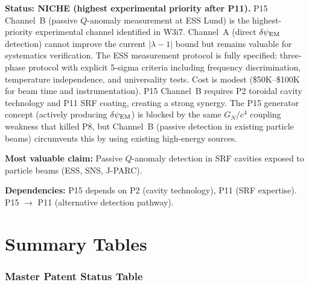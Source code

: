 \documentclass[11pt]{article}
\newcommand{\dpsiEM}{\delta\psi_{\rm EM}}
\newcommand{\lambdaone}{|\lambda{-}1|}
\begin{document}
\begin{tcolorbox}[colback=yellow!5!white, colframe=yellow!60!black,
  title=\textbf{P15: NICHE --- Resource Allocation: 3/5}]
\textbf{Status: NICHE (highest experimental priority after P11).}
P15 Channel~B (passive $Q$-anomaly measurement at ESS Lund) is the
highest-priority experimental channel identified in W3i7. Channel~A
(direct $\dpsiEM$ detection) cannot improve the current $\lambdaone$
bound but remains valuable for systematics verification. The ESS
measurement protocol is fully specified: three-phase protocol with
explicit 5-sigma criteria including frequency discrimination,
temperature independence, and universality tests. Cost is modest
(\$50K--\$100K for beam time and instrumentation). P15 Channel~B
requires P2 toroidal cavity technology and P11 SRF coating, creating
a strong synergy. The P15 generator concept (actively producing
$\dpsiEM$) is blocked by the same $G_N/c^4$ coupling weakness that
killed P8, but Channel~B (passive detection in existing particle
beams) circumvents this by using existing high-energy sources.

\textbf{Most valuable claim:} Passive $Q$-anomaly detection in SRF
cavities exposed to particle beams (ESS, SNS, J-PARC).

\textbf{Dependencies:} P15 depends on P2 (cavity technology), P11
(SRF expertise). P15 $\to$ P11 (alternative detection pathway).
\end{tcolorbox}


\part{Summary Tables}
\label{part:tables}

\section{Master Patent Status Table}
\label{sec:master-table}
\end{document}
